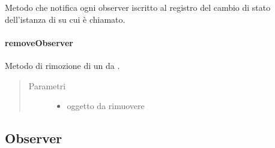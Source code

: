 \documentclass[letterpaper,10pt,italian,openany,oneside]{sphinxmanual}
\begin{document}
\begin{fulllineitems}
\label{\detokenize{source/it/unicam/cs/pa/mastermind/gamecore/Observable:it.unicam.cs.pa.mastermind.gamecore.Observable.notifyObservers()}}
Metodo che notifica ogni observer iscritto al registro  del cambio di stato dell’istanza di  su cui è chiamato.

\end{fulllineitems}



\paragraph{removeObserver}
\label{\detokenize{source/it/unicam/cs/pa/mastermind/gamecore/Observable:removeobserver}}

\begin{fulllineitems}
\label{\detokenize{source/it/unicam/cs/pa/mastermind/gamecore/Observable:it.unicam.cs.pa.mastermind.gamecore.Observable.removeObserver(Observer)}}
Metodo di rimozione di un  da .
\begin{quote}\begin{description}
\item[{Parametri}] \leavevmode\begin{itemize}
\item {} 
 \textendash{} oggetto  da rimuovere

\end{itemize}

\end{description}\end{quote}

\end{fulllineitems}



\subsection{Observer}
\label{\detokenize{source/it/unicam/cs/pa/mastermind/gamecore/Observer:observer}}\label{\detokenize{source/it/unicam/cs/pa/mastermind/gamecore/Observer::doc}}
\end{document}
